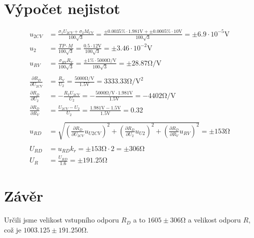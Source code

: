 \documentclass{article}
\begin{document}
\section{Výpočet nejistot}
$$
\begin{aligned}
    u_{2CV} &= \frac{\sigma_1 U_{2CV} + \sigma_2 M_{CV}}{100 \sqrt{3}} = \frac{\pm 0.0035 \% \cdot 1.981 \si{\volt} + \pm 0.0005 \% \cdot 10 \si{\volt}}{100 \sqrt{3}} = \pm 6.9 \cdot 10^{-5} \si{\volt} \\
    u_2 &= \frac{TP \cdot M}{100 \sqrt{3}} = \frac{0.5 \cdot 12 \si{\volt}}{100 \sqrt{3}} = \pm3.46 \cdot 10^{-2} \si{\volt} \\
    u_{RV} &= \frac{\sigma_{RV} R_V}{100 \sqrt{3}} = \frac{\pm 1 \% \cdot 5000 \si{\ohm\per\volt}}{100 \sqrt{3}} = \pm 28.87 \si{\ohm\per\volt} \\
     \\
    \frac{\partial R_D}{\partial U_{2CV}} &= \frac{R_V}{U_2} = \frac{5000 \si{\ohm\per\volt}}{1.5 \si{\volt}} = 3333.33 \si{\ohm\per\volt\squared} \\
    \frac{\partial R_D}{\partial U_2} &= -\frac{R_V U_{2CV}}{U_2} = -\frac{5000 \si{\ohm\per\volt} \cdot 1.981 \si{\volt}}{1.5 \si{\volt}} = -4402 \si{\ohm\per\volt} \\
    \frac{\partial R_D}{\partial R_V} &= \frac{U_{2CV} - U_2}{U_2} = \frac{1.981 \si{\volt} - 1.5 \si{\volt}}{1.5 \si{\volt}} = 0.32 \\
     \\
    u_{RD} &= \sqrt{(\frac{\partial R_D}{\partial U_{2CV}}u_{U2CV})^2+(\frac{\partial R_D}{\partial U_{2}}u_{U2})^2+(\frac{\partial R_D}{\partial R_{V}}u_{RV})^2} = \pm 153 \si{\ohm} \\
     \\
    U_{RD} &= u_{RD} k_r = \pm 153 \si{\ohm} \cdot 2 = \pm 306 \si{\ohm} \\
    U_{R} &= \frac{U_{RD}}{1.6} = \pm 191.25 \si{\ohm}
\end{aligned}
$$

\section{Závěr}
Určili jsme velikost vstupního odporu $R_D$ a to $1605 \pm 306 \si{\ohm}$ a velikost odporu $R$, což je $1003.125 \pm 191.250 \si{\ohm}$.
\end{document}
